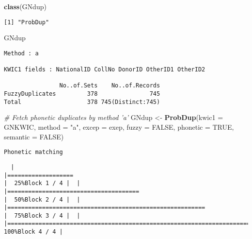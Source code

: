 \documentclass[
]{article}
\newenvironment{Shaded}{\begin{snugshade}}{\end{snugshade}}
\newcommand{\CommentTok}[1]{\textcolor[rgb]{0.56,0.35,0.01}{\textit{#1}}}
\newcommand{\DataTypeTok}[1]{\textcolor[rgb]{0.13,0.29,0.53}{#1}}
\newcommand{\KeywordTok}[1]{\textcolor[rgb]{0.13,0.29,0.53}{\textbf{#1}}}
\newcommand{\NormalTok}[1]{#1}
\newcommand{\OtherTok}[1]{\textcolor[rgb]{0.56,0.35,0.01}{#1}}
\newcommand{\StringTok}[1]{\textcolor[rgb]{0.31,0.60,0.02}{#1}}
\begin{document}
\begin{Shaded}
\begin{Highlighting}[]
\KeywordTok{class}\NormalTok{(GNdup)}
\end{Highlighting}
\end{Shaded}

\begin{verbatim}
[1] "ProbDup"
\end{verbatim}

\begin{Shaded}
\begin{Highlighting}[]
\NormalTok{GNdup}
\end{Highlighting}
\end{Shaded}

\begin{verbatim}
Method : a

KWIC1 fields : NationalID CollNo DonorID OtherID1 OtherID2
 
                No..of.Sets    No..of.Records
FuzzyDuplicates         378               745
Total                   378 745(Distinct:745)
\end{verbatim}

\begin{Shaded}
\begin{Highlighting}[]
\CommentTok{# Fetch phonetic duplicates by method 'a'}
\NormalTok{GNdup <-}\StringTok{ }\KeywordTok{ProbDup}\NormalTok{(}\DataTypeTok{kwic1 =}\NormalTok{ GNKWIC, }\DataTypeTok{method =} \StringTok{"a"}\NormalTok{, }\DataTypeTok{excep =}\NormalTok{ exep, }\DataTypeTok{fuzzy =} \OtherTok{FALSE}\NormalTok{,}
                 \DataTypeTok{phonetic =} \OtherTok{TRUE}\NormalTok{, }\DataTypeTok{semantic =} \OtherTok{FALSE}\NormalTok{)}
\end{Highlighting}
\end{Shaded}

\begin{verbatim}
Phonetic matching
\end{verbatim}

\begin{verbatim}
  |                                                                                    |===================                                                         |  25%Block 1 / 4 |  |                                                                                    |======================================                                      |  50%Block 2 / 4 |  |                                                                                    |=========================================================                   |  75%Block 3 / 4 |  |                                                                                    |============================================================================| 100%Block 4 / 4 |
\end{verbatim}
\end{document}
